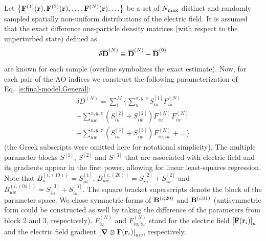 \documentclass[aip,amsmath,amssymb,reprint]{revtex4-1}
\newcommand{\BM}[1]{\bm{#1}}
\begin{document}
Let  
$\left\{ {\bf F}^{(1)}({\bf r}), {\bf F}^{(2)}({\bf r}), \ldots, {\bf F}^{(N)}({\bf r}), \ldots \right\}$ 
be a set of $N_{\rm max}$ distinct and randomly sampled 
spatially non\hyp{}uniform distributions of the electric field. It is assumed that
the exact difference one\hyp{}particle density matrices (with respect to the unperturbed state)
defined as
%
\begin{equation}
 \delta \overline{\bf D}^{(N)} \equiv \overline{\bf D}^{(N)} - \overline{\bf D}^{(0)}
\end{equation}
%
are known for each sample (overline symbolizes the exact estimate).
Now, for each pair of the AO indices we construct the following 
parameterization of Eq.~\eqref{e:final-model.General}:
%
\begin{multline}\label{e:final-model.General.Parameters}
 \delta D^{(N)} = \sum_{i }^M \Big\{ 
                              \sum_u^{x,y,z} S^{[1]}_{iu} F_{iu}^{(N)} \\
                +             \sum_{uw}^{x,y,z} \left( S^{[2]}_{iu} + S^{[2]}_{iw} \right) F_{iu}^{(N)} F_{iw}^{(N)} \\
                +             \sum_{uw}^{x,y,z} \left( S^{[3]}_{iu} + S^{[3]}_{iw}\right) F_{iu,iw}^{(N)}
                        + \ldots \Big\}
\end{multline}
%
(the Greek subscripts were omitted here for notational simplicity).
The multiple parameter blocks 
$S^{[1]}$, $S^{[2]}$ and $S^{[3]}$ that are associated with electric field and its gradients
appear in the first power, allowing for linear least\hyp{}squares regression.
Note that $B_u^{(i,(10))} = S^{[1]}_{iu}$, $B_{uw}^{(i,(20))} = S^{[2]}_{iu} + S^{[2]}_{iw}$
and $B_{uw}^{(i,(01))} = S^{[3]}_{iu} + S^{[3]}_{iw}$. The square bracket superscripts 
denote the block of the parameter space. We chose symmetric forms of ${\bf B}^{(i;20)}$
and ${\bf B}^{(i;01)}$ (antisymmetric form could be constructed as well by taking the difference
of the parameters from block 2 and 3, respectively). $F_{iu}^{(N)}$ and $F_{iu,iw}^{(N)}$ 
stand for the electric field $\left[ {\bf F}({\bf r}_i)\right]_u$ and the electric field
gradient $\left[ {\BM \nabla} \otimes {\bf F}({\bf r}_i) \right]_{uw}$, respectively.
\end{document}
